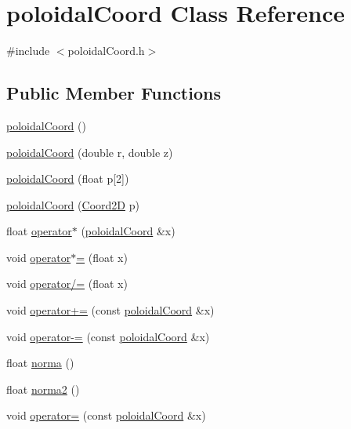 \hypertarget{classpoloidalCoord}{
\section{poloidalCoord Class Reference}
\label{classpoloidalCoord}
}


{\ttfamily \#include $<$poloidalCoord.h$>$}

\subsection*{Public Member Functions}
\begin{DoxyCompactItemize}
\item 
\hyperlink{classpoloidalCoord_ac684d2f1926109054efe66afc01bf485}{poloidalCoord} ()
\item 
\hyperlink{classpoloidalCoord_a3f2887b355664d5e246b51f9e559dafe}{poloidalCoord} (double r, double z)
\item 
\hyperlink{classpoloidalCoord_acb88320fe11e3bc9322ba3cca714c61d}{poloidalCoord} (float p\mbox{[}2\mbox{]})
\item 
\hyperlink{classpoloidalCoord_a3c28c9304b6c5c8286ea8366d3bb99b6}{poloidalCoord} (\hyperlink{structCoord2D}{Coord2D} p)
\item 
float \hyperlink{classpoloidalCoord_a4003eb8597a429e0d56edda6234d3e14}{operator$\ast$} (\hyperlink{classpoloidalCoord}{poloidalCoord} \&x)
\item 
void \hyperlink{classpoloidalCoord_acc5bf1bdb318304776193fb787154f8d}{operator$\ast$=} (float x)
\item 
void \hyperlink{classpoloidalCoord_aea51d4c738b8cfb47079f1cc91bf6063}{operator/=} (float x)
\item 
void \hyperlink{classpoloidalCoord_a8f4f96422e3e919dd7eef29d9717b111}{operator+=} (const \hyperlink{classpoloidalCoord}{poloidalCoord} \&x)
\item 
void \hyperlink{classpoloidalCoord_a2439747f3ea4cc9cd9c4620627b81092}{operator-\/=} (const \hyperlink{classpoloidalCoord}{poloidalCoord} \&x)
\item 
float \hyperlink{classpoloidalCoord_a242df4b771803202d290cd60c0e7aa23}{norma} ()
\item 
float \hyperlink{classpoloidalCoord_a2fd71af5fac9d84b271b4de6e5b1994f}{norma2} ()
\item 
void \hyperlink{classpoloidalCoord_a4a4b4ebe3ee15ac1287eb47af53938c0}{operator=} (const \hyperlink{classpoloidalCoord}{poloidalCoord} \&x)
\item 

\end{DoxyCompactItemize}
